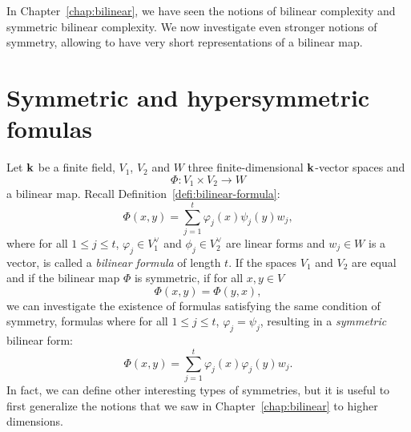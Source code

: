 In Chapter~\ref{chap:bilinear}, we have seen the notions of bilinear complexity
and symmetric bilinear complexity. We now investigate even stronger
notions of symmetry, allowing to have very short representations of a bilinear
map.

\minitoc

%
%
%

\clearpage
\section{Symmetric and hypersymmetric fomulas}
%
%
%

Let $\mathbf{k}$ be a finite field, $V_1$, $V_2$ and $W$ three finite-dimensional $\mathbf{k}$-vector
spaces and
\[
  \Phi:V_1\times V_2\to W
\]
a bilinear map. Recall Definition~\ref{defi:bilinear-formula}:
\[
  \Phi(x, y) = \sum_{j=1}^t\varphi_j(x)\psi_j(y)w_j,
\]
where for all $1\leq j\leq t$, $\varphi_j\in V_1^\vee$ and $\phi_j\in V_2^\vee$ are linear forms and
$w_j\in W$ is a vector, is called a \emph{bilinear formula} of length $t$. If
the spaces $V_1$ and $V_2$ are equal and if the bilinear map $\Phi$ is
symmetric, \ie if for all $x, y\in V$
\[
  \Phi(x, y) = \Phi(y, x),
\]
we can investigate the existence of formulas satisfying the same condition of
symmetry, \ie formulas where for all $1\leq j\leq t$, $\varphi_j=\psi_j$,
resulting in a \emph{symmetric} bilinear form:
\[
  \Phi(x, y) = \sum_{j=1}^t\varphi_j(x)\varphi_j(y)w_j.
\]
In fact, we can define other interesting types of symmetries, but it is useful
to first generalize the notions that we saw in Chapter~\ref{chap:bilinear} to
higher dimensions.
